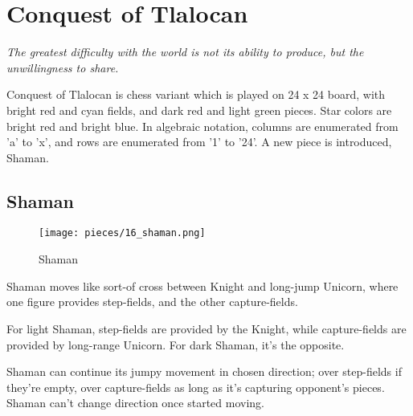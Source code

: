 

\chapter*{Conquest of Tlalocan}
\label{ch:Conquest of Tlalocan}

\begin{flushright}
\parbox{0.78\textwidth}{
\emph{The greatest difficulty with the world is not its ability to produce, but the unwillingness to share. \\
 } }
\end{flushright}

\noindent
Conquest of Tlalocan is chess variant which is played on 24 x 24 board,
with bright red and cyan fields, and dark red and light green pieces.
Star colors are bright red and bright blue. In algebraic notation, columns
are enumerated from 'a' to 'x', and rows are enumerated from '1' to '24'.
A new piece is introduced, Shaman.

\clearpage %

\section*{Shaman}
\label{sec:Conquest of Tlalocan/Shaman}

\noindent
\begin{wrapfigure}[11]{l}{0.4\textwidth}
\centering
\texttt{[image: pieces/16\_shaman.png]}
\caption{Shaman}
\label{fig:16_shaman}
\end{wrapfigure}
Shaman moves like sort-of cross between Knight and long-jump Unicorn,
where one figure provides step-fields, and the other capture-fields.

For light Shaman, step-fields are provided by the Knight, while capture-fields
are provided by long-range Unicorn. For dark Shaman, it's the opposite.

Shaman can continue its jumpy movement in chosen direction; over step-fields
if they're empty, over capture-fields as long as it's capturing opponent's
pieces. Shaman can't change direction once started moving.

